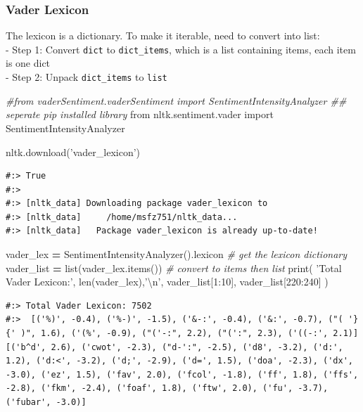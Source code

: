 \documentclass[
]{book}
\newenvironment{Shaded}{\begin{snugshade}}{\end{snugshade}}
\newcommand{\BuiltInTok}[1]{#1}
\newcommand{\CharTok}[1]{\textcolor[rgb]{0.5,0.5,0.5}{#1}}
\newcommand{\CommentTok}[1]{\textcolor[rgb]{0.37,0.37,0.37}{\textit{#1}}}
\newcommand{\DecValTok}[1]{\textcolor[rgb]{0.06,0.06,0.06}{#1}}
\newcommand{\ImportTok}[1]{#1}
\newcommand{\NormalTok}[1]{#1}
\newcommand{\OperatorTok}[1]{\textcolor[rgb]{0.43,0.43,0.43}{\textbf{#1}}}
\newcommand{\StringTok}[1]{\textcolor[rgb]{0.5,0.5,0.5}{#1}}
\begin{document}
\hypertarget{vader-lexicon}{%
\subsubsection{Vader Lexicon}\label{vader-lexicon}}

The lexicon is a dictionary. To make it iterable, need to convert into list:\\
- Step 1: Convert \texttt{dict} to \texttt{dict\_items}, which is a list containing items, each item is one dict\\
- Step 2: Unpack \texttt{dict\_items} to \texttt{list}

\begin{Shaded}
\begin{Highlighting}[]
\CommentTok{#from vaderSentiment.vaderSentiment import SentimentIntensityAnalyzer   ## seperate pip installed library}
\ImportTok{from}\NormalTok{ nltk.sentiment.vader }\ImportTok{import}\NormalTok{ SentimentIntensityAnalyzer}

\NormalTok{nltk.download(}\StringTok{'vader_lexicon'}\NormalTok{)}
\end{Highlighting}
\end{Shaded}

\begin{verbatim}
#:> True
#:> 
#:> [nltk_data] Downloading package vader_lexicon to
#:> [nltk_data]     /home/msfz751/nltk_data...
#:> [nltk_data]   Package vader_lexicon is already up-to-date!
\end{verbatim}

\begin{Shaded}
\begin{Highlighting}[]
\NormalTok{vader_lex  }\OperatorTok{=}\NormalTok{ SentimentIntensityAnalyzer().lexicon  }\CommentTok{# get the lexicon dictionary}
\NormalTok{vader_list }\OperatorTok{=} \BuiltInTok{list}\NormalTok{(vader_lex.items())               }\CommentTok{# convert to items then list}
\BuiltInTok{print}\NormalTok{( }\StringTok{'Total Vader Lexicon:'}\NormalTok{, }\BuiltInTok{len}\NormalTok{(vader_lex),}\StringTok{'}\CharTok{\textbackslash{}n}\StringTok{'}\NormalTok{,}
\NormalTok{        vader_list[}\DecValTok{1}\NormalTok{:}\DecValTok{10}\NormalTok{], vader_list[}\DecValTok{220}\NormalTok{:}\DecValTok{240}\NormalTok{] )}
\end{Highlighting}
\end{Shaded}

\begin{verbatim}
#:> Total Vader Lexicon: 7502 
#:>  [('%)', -0.4), ('%-)', -1.5), ('&-:', -0.4), ('&:', -0.7), ("( '}{' )", 1.6), ('(%', -0.9), ("('-:", 2.2), ("(':", 2.3), ('((-:', 2.1)] [('b^d', 2.6), ('cwot', -2.3), ("d-':", -2.5), ('d8', -3.2), ('d:', 1.2), ('d:<', -3.2), ('d;', -2.9), ('d=', 1.5), ('doa', -2.3), ('dx', -3.0), ('ez', 1.5), ('fav', 2.0), ('fcol', -1.8), ('ff', 1.8), ('ffs', -2.8), ('fkm', -2.4), ('foaf', 1.8), ('ftw', 2.0), ('fu', -3.7), ('fubar', -3.0)]
\end{verbatim}
\end{document}
